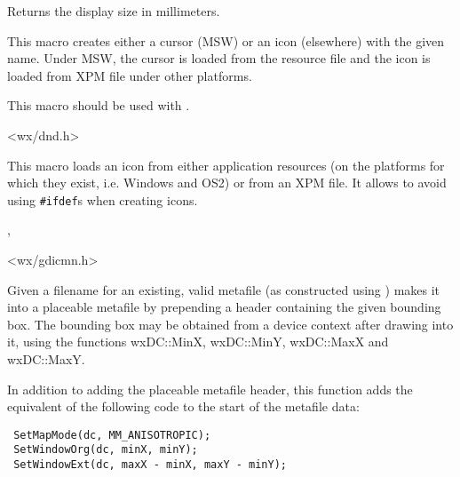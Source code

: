 

Returns the display size in millimeters.


\label{wxdropicon}


This macro creates either a cursor (MSW) or an icon (elsewhere) with the given
name. Under MSW, the cursor is loaded from the resource file and the icon is
loaded from XPM file under other platforms.

This macro should be used with
.


<wx/dnd.h>


\label{wxiconmacro}


This macro loads an icon from either application resources (on the platforms
for which they exist, i.e. Windows and OS2) or from an XPM file. It allows to
avoid using {\tt \#ifdef}s when creating icons.


,


<wx/gdicmn.h>


\label{wxmakemetafileplaceable}


Given a filename for an existing, valid metafile (as constructed using )
makes it into a placeable metafile by prepending a header containing the given
bounding box. The bounding box may be obtained from a device context after drawing
into it, using the functions wxDC::MinX, wxDC::MinY, wxDC::MaxX and wxDC::MaxY.

In addition to adding the placeable metafile header, this function adds
the equivalent of the following code to the start of the metafile data:

\begin{verbatim}
 SetMapMode(dc, MM_ANISOTROPIC);
 SetWindowOrg(dc, minX, minY);
 SetWindowExt(dc, maxX - minX, maxY - minY);
\end{verbatim}

